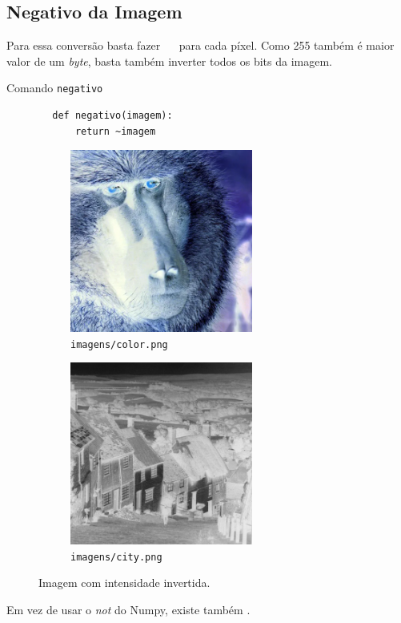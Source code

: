 \subsection{Negativo da Imagem}

Para essa conversão basta fazer ~~ para cada píxel. Como 255 também é maior valor de um \textit{byte}, basta também inverter todos os bits da imagem.

\begin{listing}[h]
    \caption{Comando \texttt{negativo}}

    \begin{verbatim}
        def negativo(imagem):
            return ~imagem
    \end{verbatim}
\end{listing}

\begin{figure}[h]
    \centering
    \begin{subfigure}{0.45\textwidth}
        \centering
        \includegraphics[width=6cm]{resultados/colorneg.png}
        \caption{\texttt{imagens/color.png}}
    \end{subfigure}%
    \begin{subfigure}{0.45\textwidth}
        \centering
        \includegraphics[width=6cm]{resultados/cityneg.png}
        \caption{\texttt{imagens/city.png}}
    \end{subfigure}

    \caption{Imagem com intensidade invertida.}
\end{figure}

Em vez de usar o \textit{not} do Numpy, existe também  \autocite{ref:bitwise_not}.
